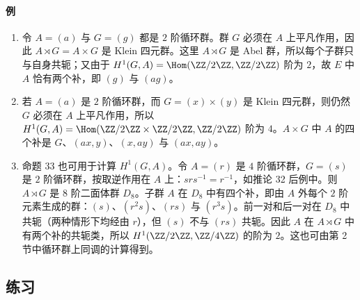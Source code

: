 \paragraph{例}
\begin{enumerate}[label=(\arabic*)]
  \item 令 $A=(a)$ 与 $G=(g)$ 都是 $2$ 阶循环群。群 $G$ 必须在 $A$ 上平凡作用，因此 $A\rtimes G=A\times G$ 是 Klein 四元群。这里 $A\rtimes G$ 是 Abel 群，所以每个子群只与自身共轭；又由于 $H^1(G,A)=\Hom(\ZZ/2\ZZ,\ZZ/2\ZZ)$ 阶为 $2$，故 $E$ 中 $A$ 恰有两个补，即 $(g)$ 与 $(ag)$。
  \item 若 $A=(a)$ 是 $2$ 阶循环群，而 $G=(x)\times(y)$ 是 Klein 四元群，则仍然 $G$ 必须在 $A$ 上平凡作用，所以 $H^1(G,A)=\Hom(\ZZ/2\ZZ\times\ZZ/2\ZZ,\ZZ/2\ZZ)$ 阶为 $4$。$A\times G$ 中 $A$ 的四个补是 $G$、$(ax,y)$、$(x,ay)$ 与 $(ax,ay)$。
  \item 命题 33 也可用于计算 $H^1(G,A)$。令 $A=(r)$ 是 $4$ 阶循环群，$G=(s)$ 是 $2$ 阶循环群，按取逆作用在 $A$ 上：$srs^{-1}=r^{-1}$，如推论 32 后例中。则 $A\rtimes G$ 是 $8$ 阶二面体群 $D_8$。子群 $A$ 在 $D_8$ 中有四个补，即由 $A$ 外每个 $2$ 阶元素生成的群：$(s)$、$(r^2s)$、$(rs)$ 与 $(r^3s)$。前一对和后一对在 $D_8$ 中共轭（两种情形下均经由 $r$），但 $(s)$ 不与 $(rs)$ 共轭。因此 $A$ 在 $A\rtimes G$ 中有两个补的共轭类，所以 $H^1(\ZZ/2\ZZ,\ZZ/4\ZZ)$ 的阶为 $2$。这也可由第 2 节中循环群上同调的计算得到。
\end{enumerate}

\subsection*{练习}

